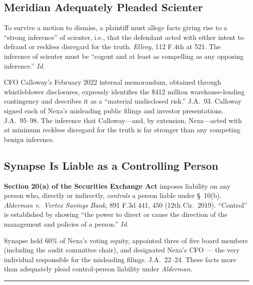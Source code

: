 \documentclass[12pt]{article}
\newcommand{\courtcase}[1]{\textit{#1}}
\newcommand{\statute}[1]{\textbf{#1}}
\newcommand{\goldrule}{%
  {\color{GoldAccent}\rule{\linewidth}{0.8pt}}%
}
\begin{document}
\subsection{Meridian Adequately Pleaded Scienter}

To survive a motion to dismiss, a plaintiff must allege facts giving rise to
a ``strong inference'' of scienter, i.e., that the defendant acted with either
intent to defraud or reckless disregard for the truth. \courtcase{Ellroy}, 112
F.4th at 521. The inference of scienter must be ``cogent and at least as compelling
as any opposing inference.'' \textit{Id.}

CFO Calloway's February 2022 internal memorandum, obtained through whistleblower
disclosures, expressly identifies the \$412 million warehouse-lending contingency
and describes it as a ``material undisclosed risk.'' J.A.\ 93. Calloway signed
each of Nexa's misleading public filings and investor presentations. J.A.\ 95--98.
The inference that Calloway---and, by extension, Nexa---acted with at minimum
reckless disregard for the truth is far stronger than any competing benign
inference.

\subsection{Synapse Is Liable as a Controlling Person}

\statute{Section 20(a) of the Securities Exchange Act} imposes liability on any
person who, directly or indirectly, \textit{controls} a person liable under \S\ 10(b).
\courtcase{Alderman v.\ Vertex Savings Bank}, 891 F.3d 441, 450 (12th Cir.\ 2019).
``Control'' is established by showing ``the power to direct or cause the direction
of the management and policies of a person.'' \textit{Id.}

Synapse held 60\% of Nexa's voting equity, appointed three of five board members
(including the audit committee chair), and designated Nexa's CFO --- the very
individual responsible for the misleading filings. J.A.\ 22--24. These facts
more than adequately plead control-person liability under \courtcase{Alderman}.

\vspace{12pt}
\goldrule
\vspace{12pt}

\end{document}
